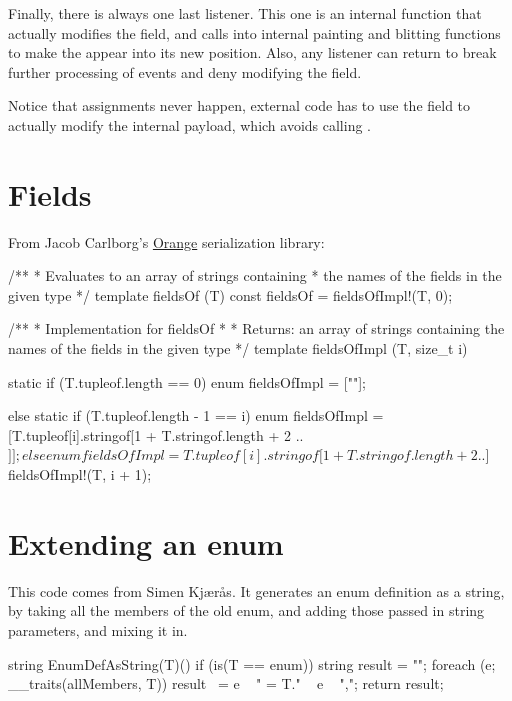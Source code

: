 Finally, there is always one last listener. This one is an internal function that actually modifies the  field, and calls into internal painting and blitting functions to make the  appear into its new position. Also, any listener can return  to break further processing of events and deny modifying the field.

Notice that assignments never happen, external code has to use the  field to actually modify the internal payload, which avoids calling .

\section{Fields}

From Jacob Carlborg's \href{https://github.com/jacob-carlborg/orange}{Orange} serialization library:

\begin{dcode}
/**
 * Evaluates to an array of strings containing 
 * the names of the fields in the given type
 */
template fieldsOf (T)
{
	const fieldsOf = fieldsOfImpl!(T, 0);
}

/**
 * Implementation for fieldsOf
 * 
 * Returns: an array of strings containing the names of the fields in the given type
 */
template fieldsOfImpl (T, size_t i)
{
    static if (T.tupleof.length == 0)
        enum fieldsOfImpl = [""];

    else static if (T.tupleof.length - 1 == i)
        enum fieldsOfImpl = [T.tupleof[i].stringof[1 + T.stringof.length + 2 .. $]];

    else
        enum fieldsOfImpl = T.tupleof[i].stringof[1 + T.stringof.length + 2 .. $] ~ fieldsOfImpl!(T, i + 1);
}
\end{dcode}

\section{Extending an enum}

This code comes from Simen Kj\ae r\r{a}s.  It generates an enum definition as a string, by taking all the members of the old enum, and adding those passed in string parameters, and mixing it in.

\begin{dcode}
string EnumDefAsString(T)() 
if (is(T == enum)) 
{
   string result = "";
   foreach (e; __traits(allMembers, T))
       result ~= e ~ " = T." ~ e ~ ",";
   return result;
}
\end{dcode}

